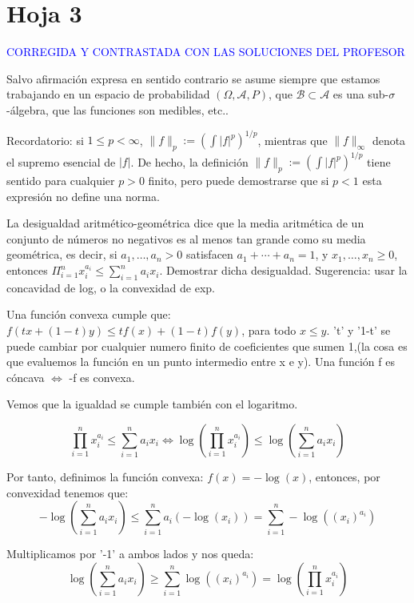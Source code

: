 

\newpage
\section{Hoja 3}

\textcolor{blue}{CORREGIDA Y CONTRASTADA CON LAS SOLUCIONES DEL PROFESOR}


Salvo afirmaci\'on expresa en sentido
contrario se asume siempre que estamos trabajando en un espacio de probabilidad $(\Omega, \mathcal{A}, P)$,
que  $\mathcal{B}\subset \mathcal{A}$ es una sub-$\sigma$-\'algebra, que las funciones son medibles, etc..

Recordatorio: si $1\le p < \infty$, $\|f\|_p := \left(\int|f|^p\right)^{1/p}$, mientras que
$\|f\|_\infty$ denota el supremo esencial de $|f|$. De hecho, la definici\'on
 $\|f\|_p := \left(\int|f|^p\right)^{1/p}$ tiene sentido para cualquier $p > 0$ finito, pero puede demostrarse que si $p < 1$ esta expresi\'on no define una norma.


\begin{problem}[1] La desigualdad aritm\'etico-geom\'etrica 
dice que la media  aritm\'etica de un conjunto de n\'umeros no negativos es al menos tan grande
como su media  geom\'etrica, es decir, si $a_1, \dots ,a_n > 0$ satisfacen  $a_1 + \cdots  + a_n = 1$,  y  
 $x_1, \dots ,x_n \ge 0$, entonces $\Pi_{i=1}^n x_i^{a_i} \le \sum_{i=1}^n a_i x_i$.
Demostrar dicha desigualdad. Sugerencia: usar la concavidad
de log, o la convexidad de exp.
\solution

\begin{expla}
Una función convexa cumple que: $f(tx+(1-t)y) \leq tf(x)+(1-t)f(y)$, para todo $x\leq y$. 't' y '1-t' se puede cambiar por cualquier numero finito de coeficientes que sumen 1,(la cosa es que evaluemos la función en un punto intermedio entre x e y).
Una función f es cóncava $\Leftrightarrow$ -f es convexa.
\end{expla}
Vemos que la igualdad se cumple también con el logaritmo.

\[
\prod_{i=1}^n x_i^{a_i} \leq \sum_{i=1}^{n}a_i x_i \Leftrightarrow \log\left(\prod_{i=1}^n x_i^{a_i}\right) \leq \log \left(\sum_{i=1}^{n}a_i x_i\right)
\]

Por tanto, definimos la función convexa: $f(x) = -\log(x)$, entonces, por convexidad tenemos que:
\[
-\log \left(\sum_{i=1}^{n}a_i x_i\right) \leq \sum_{i=1}^{n} a_i\left(-\log(x_i)\right) = \sum_{i=1}^{n} -\log\left((x_i)^{a_i}\right) 
\]
 
Multiplicamos por '-1' a ambos lados y nos queda:
\[
\log \left(\sum_{i=1}^{n}a_i x_i\right) \geq \sum_{i=1}^{n} \log\left((x_i)^{a_i}\right) = \log\left(\prod_{i=1}^n x_i^{a_i}\right) 
\]


\end{problem}


